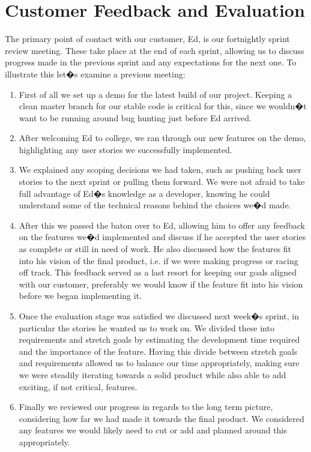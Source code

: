 \section{Customer Feedback and Evaluation}
The primary point of contact with our customer, Ed, is our fortnightly sprint review meeting. These take place at the end of each sprint, allowing us to discuss progress made in the previous sprint and any expectations for the next one. To illustrate this let�s examine a previous meeting:
\begin{enumerate}
\item First of all we set up a demo for the latest build of our project. Keeping a clean master branch for our stable code is critical for this, since we wouldn�t want to be running around bug hunting just before Ed arrived.
\item After welcoming Ed to college, we ran through our new features on the demo, highlighting any user stories we successfully implemented. 
\item We explained any scoping decisions we had taken, such as pushing back user stories to the next sprint or pulling them forward. We were not afraid to take full advantage of Ed�s knowledge as a developer, knowing he could understand some of the technical reasons behind the choices we�d made. 
\item  After this we passed the baton over to Ed, allowing him to offer any feedback on the features we�d implemented and discuss if he accepted the user stories as complete or still in need of work. He also discussed how the features fit into his vision of the final product, i.e. if we were making progress or racing off track. This feedback served as a last resort for keeping our goals aligned with our customer, preferably we would know if the feature fit into his vision before we began implementing it.
\item Once the evaluation stage was satisfied we discussed next week�s sprint, in particular the stories he wanted us to work on. We divided these into requirements and stretch goals by estimating the development time required and the importance of the feature. Having this divide between stretch goals and requirements allowed us to balance our time appropriately, making sure we were steadily iterating towards a solid product while also able to add exciting, if not critical, features.
\item Finally we reviewed our progress in regards to the long term picture, considering how far we had made it towards the final product. We considered any features we would likely need to cut or add and planned around this appropriately.
\end{enumerate}

